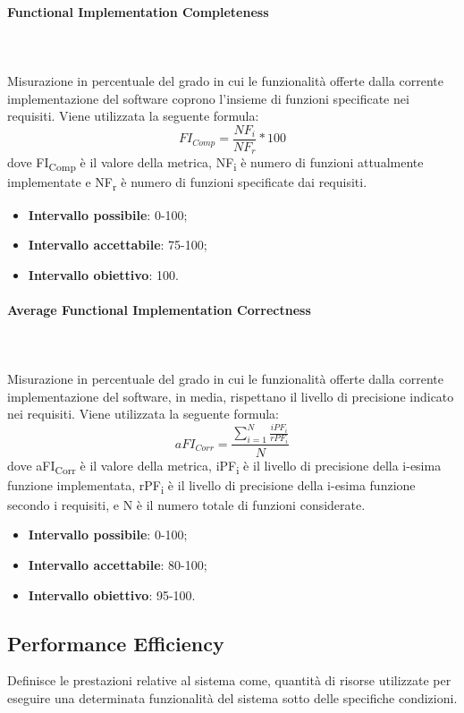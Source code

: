\paragraph{Functional Implementation Completeness} ~\\ ~\\
Misurazione in percentuale del grado in cui le funzionalità offerte dalla corrente implementazione del software coprono l'insieme di funzioni specificate nei requisiti.
Viene utilizzata la seguente formula:
$$FI_{Comp}=\frac{NF_i}{NF_r}*100$$
dove FI\textsubscript{Comp} è il valore della metrica, NF\textsubscript{i} è numero di funzioni attualmente implementate e NF\textsubscript{r} è numero di funzioni specificate dai requisiti.
\begin{itemize}
	\item{\textbf{Intervallo possibile}: 0-100;}
	\item{\textbf{Intervallo accettabile}: 75-100;}
	\item{\textbf{Intervallo obiettivo}: 100.}
\end{itemize}

\paragraph{Average Functional Implementation Correctness} ~\\ ~\\
Misurazione in percentuale del grado in cui le funzionalità offerte dalla corrente implementazione del software, in media, rispettano il livello di precisione indicato nei requisiti.
Viene utilizzata la seguente formula:
$$aFI_{Corr}=\frac{\sum\limits_{i=1}^N\frac{iPF_i}{rPF_i}}{N}$$
dove aFI\textsubscript{Corr} è il valore della metrica, iPF\textsubscript{i} è il livello di precisione della i-esima funzione implementata, rPF\textsubscript{i} è il livello di precisione della i-esima funzione secondo i requisiti, e N è il numero totale di funzioni considerate.
\begin{itemize}
	\item{\textbf{Intervallo possibile}: 0-100;}
	\item{\textbf{Intervallo accettabile}: 80-100;}
	\item{\textbf{Intervallo obiettivo}: 95-100.}
\end{itemize}

\subsection{Performance Efficiency}
Definisce le prestazioni relative al sistema come, quantità di risorse utilizzate per eseguire una determinata funzionalità del sistema sotto delle specifiche condizioni. 
